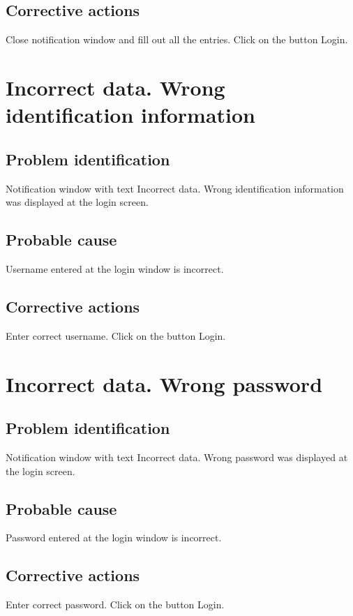 \subsection{Corrective actions}
Close notification window and fill out all the entries. Click on the button Login.


\section{Incorrect data. Wrong identification information}

\subsection{Problem identification}
Notification window with text Incorrect data. Wrong identification information
was displayed at the login screen.

\subsection{Probable cause}
Username entered at the login window is incorrect.

\subsection{Corrective actions}
Enter correct username. Click on the button Login.


\section{Incorrect data. Wrong password}

\subsection{Problem identification}
Notification window with text Incorrect data. Wrong password
was displayed at the login screen.

\subsection{Probable cause}
Password entered at the login window is incorrect.

\subsection{Corrective actions}
Enter correct password. Click on the button Login.



